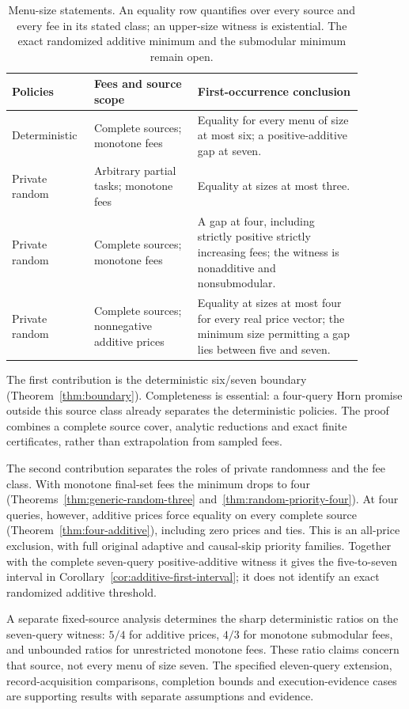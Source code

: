 \documentclass[pdflatex,sn-mathphys-num]{sn-jnl}
\theoremstyle{thmstyleone}
\theoremstyle{thmstylethree}
\theoremstyle{thmstyletwo}
\begin{document}
\begin{table}[ht]
\centering\small
\begin{tabular}{@{}p{0.18\linewidth}p{0.27\linewidth}p{0.43\linewidth}@{}}
\toprule
Policies & Fees and source scope & First-occurrence conclusion\\
\midrule
Deterministic & Complete sources; monotone fees
& Equality for every menu of size at most six; a positive-additive gap at seven.\\[3pt]
Private random & Arbitrary partial tasks; monotone fees
& Equality at sizes at most three.\\[3pt]
Private random & Complete sources; monotone fees
& A gap at four, including strictly positive strictly increasing fees; the witness is nonadditive and nonsubmodular.\\[3pt]
Private random & Complete sources; nonnegative additive prices
& Equality at sizes at most four for every real price vector; the minimum size permitting a gap lies between five and seven.\\
\bottomrule
\end{tabular}
\caption{Menu-size statements. An equality row quantifies over every source
and every fee in its stated class; an upper-size witness is existential.
The exact randomized additive minimum and the submodular minimum remain open.}
\label{tab:core-boundaries}
\end{table}

The first contribution is the deterministic six/seven boundary
(Theorem~\ref{thm:boundary}). Completeness is essential: a four-query Horn
promise outside this source class already separates the deterministic
policies. The proof combines a complete source cover, analytic reductions
and exact finite certificates, rather than extrapolation from sampled fees.

The second contribution separates the roles of private randomness and the
fee class. With monotone final-set fees the minimum drops to four
(Theorems~\ref{thm:generic-random-three} and~\ref{thm:random-priority-four}).
At four queries, however, additive prices force equality on every complete
source (Theorem~\ref{thm:four-additive}), including zero prices and ties.
This is an all-price exclusion, with full original adaptive and causal-skip
priority families. Together with the complete seven-query positive-additive
witness it gives the five-to-seven interval in
Corollary~\ref{cor:additive-first-interval}; it does not identify an exact
randomized additive threshold.

A separate fixed-source analysis determines the sharp deterministic
ratios on the seven-query witness: $5/4$ for additive prices, $4/3$ for
monotone submodular fees, and unbounded ratios for unrestricted monotone
fees. These ratio claims concern that source, not every menu of size seven.
The specified eleven-query extension, record-acquisition comparisons,
completion bounds and execution-evidence cases are supporting results
with separate assumptions and evidence.
\end{document}
